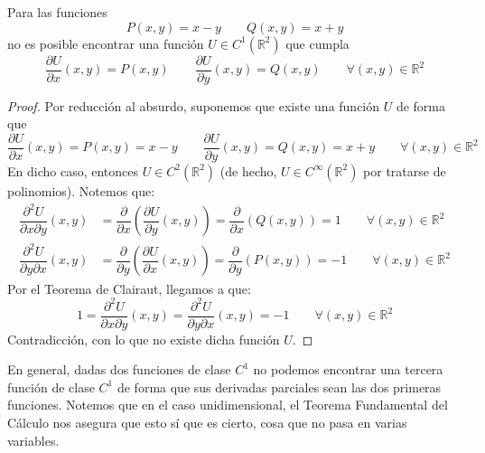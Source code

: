 \begin{ejemplo}
    Para las funciones
    \begin{equation*}
        P(x,y) = x-y \qquad Q(x,y) = x+y
    \end{equation*}
    no es posible encontrar una función $U\in C^1(\mathbb{R}^2)$ que cumpla
    \begin{equation*}
        \dfrac{\partial U}{\partial x}(x,y) = P(x,y) \qquad \dfrac{\partial U}{\partial y}(x,y) = Q(x,y) \qquad \forall (x,y)\in \mathbb{R}^2
    \end{equation*}
    \begin{proof}
        Por reducción al absurdo, suponemos que existe una función $U$ de forma que
    \begin{equation*}
        \dfrac{\partial U}{\partial x}(x,y) = P(x,y) = x-y \qquad \dfrac{\partial U}{\partial y}(x,y) = Q(x,y) = x+y \qquad \forall (x,y)\in \mathbb{R}^2
    \end{equation*}
    En dicho caso, entonces $U\in C^2(\mathbb{R}^2)$ (de hecho, $U\in C^\infty(\mathbb{R}^2)$ por tratarse de polinomios). Notemos que:
    \begin{align*}
        \dfrac{\partial^2 U}{\partial x\partial y}(x,y) &= \dfrac{\partial }{\partial x}\left(\dfrac{\partial U}{\partial y}(x,y)\right) = \dfrac{\partial }{\partial x}(Q(x,y)) = 1 \qquad \forall (x,y)\in \mathbb{R}^2 \\
        \dfrac{\partial^2 U}{\partial y\partial x}(x,y) &= \dfrac{\partial }{\partial y}\left(\dfrac{\partial U}{\partial x}(x,y)\right) = \dfrac{\partial }{\partial y}(P(x,y)) = -1 \qquad \forall (x,y)\in \mathbb{R}^2 
    \end{align*}
    Por el Teorema de Clairaut, llegamos a que:
    \begin{equation*}
        1 = \dfrac{\partial^2 U}{\partial x\partial y}(x,y) = \dfrac{\partial^2 U}{\partial y\partial x}(x,y) = -1 \qquad \forall (x,y)\in \mathbb{R}^2
    \end{equation*}
    Contradicción, con lo que no existe dicha función $U$.
    \end{proof}
\end{ejemplo}

En general, dadas dos funciones de clase $C^1$ no podemos encontrar una tercera función de clase $C^1$ de forma que sus derivadas parciales sean las dos primeras funciones. Notemos que en el caso unidimensional, el Teorema Fundamental del Cálculo nos asegura que esto sí que es cierto, cosa que no pasa en varias variables.\\

